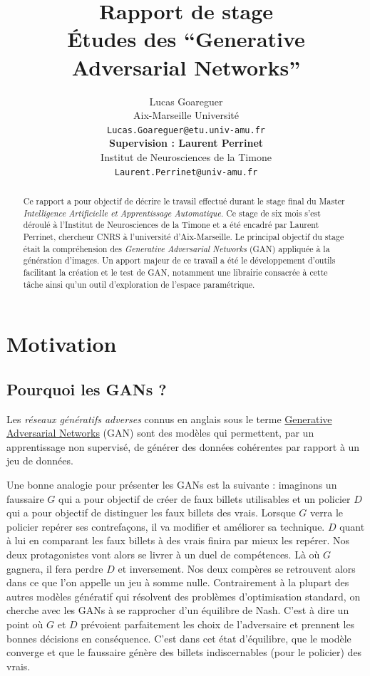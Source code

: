 \documentclass[11pt,francais]{article}
\title{Rapport de stage\\ Études des ``Generative Adversarial Networks''}
\author{Lucas Goareguer \\
  Aix-Marseille Université \\
  {\small \texttt{Lucas.Goareguer@etu.univ-amu.fr}   } \\\And
   {\bf Supervision : Laurent Perrinet} \\
  Institut de Neurosciences de la Timone \\
  {\small \tt Laurent.Perrinet@univ-amu.fr} \\}
\date{}
\begin{document}
\maketitle
\begin{abstract}
Ce rapport a pour objectif de décrire le travail effectué durant le stage final du Master \emph{Intelligence Artificielle et Apprentissage Automatique}. Ce stage de six mois s'est déroulé à l'Institut de Neurosciences de la Timone et a été encadré par Laurent Perrinet, chercheur CNRS à l'université d'Aix-Marseille. Le principal objectif du stage était la compréhension des \textit{Generative Adversarial Networks} (GAN) appliquée à la génération d'images. Un apport majeur de ce travail a été le développement d'outils facilitant la création et le test de GAN, notamment une librairie consacrée à cette tâche ainsi qu'un outil d'exploration de l'espace paramétrique.
\end{abstract}


\section{Motivation}

\subsection{Pourquoi les GANs ?}
\label{sec:Intro}
Les \emph{réseaux génératifs adverses} connus en anglais sous le terme \href{https://en.wikipedia.org/wiki/Generative_adversarial_network}{Generative Adversarial Networks} (GAN) sont des modèles qui permettent, par un apprentissage non supervisé, de générer des données cohérentes par rapport à un jeu de données.

Une bonne analogie pour présenter les GANs est la suivante : imaginons un faussaire \(G\) qui a pour objectif de créer de faux billets utilisables et un policier \(D\) qui a pour objectif de distinguer les faux billets des vrais.
Lorsque \(G\) verra le policier repérer ses contrefaçons, il va modifier et améliorer sa technique. \(D\) quant à lui en comparant les faux billets à des vrais finira par mieux les repérer. Nos deux protagonistes vont alors se livrer à un duel de compétences. Là où \(G\) gagnera, il fera perdre \(D\) et inversement. Nos deux compères se retrouvent alors dans ce que l'on appelle un jeu à somme nulle. Contrairement à la plupart des autres modèles génératif qui résolvent des problèmes d'optimisation standard, on cherche avec les GANs à se rapprocher d'un équilibre de Nash. C'est à dire un point où \(G\) et \(D\) prévoient parfaitement les choix de l'adversaire et prennent les bonnes décisions en conséquence. C'est dans cet état d'équilibre, que le modèle converge et que le faussaire génère des billets indiscernables (pour le policier) des vrais.
\end{document}
